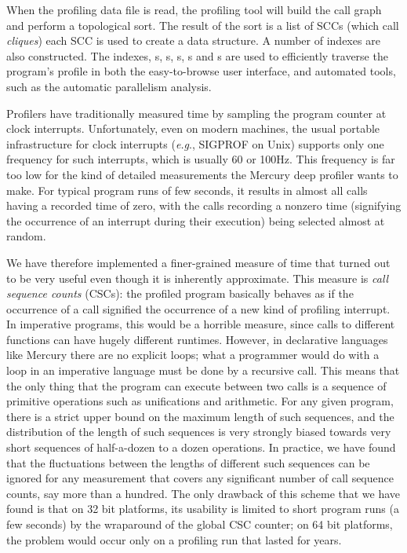\noindent
When the profiling data file is read,
the profiling tool will build the call graph and perform a topological
sort.
The result of the sort is a list of SCCs
(which \citet{conway:2001:mercury-deep} call \emph{cliques})
each SCC is used to create a \Clique data structure.
A number of indexes are also constructed.
The indexes, {\Clique}s, {\PS}s, {\PD}s, {\CSS}s and {\CSD}s are used to
efficiently traverse the program's profile in both
the easy-to-browse user interface,
and automated tools, such as the automatic parallelism analysis.

Profilers have traditionally measured time
by sampling the program counter at clock interrupts.
Unfortunately, even on modern machines,
the usual portable infrastructure for clock interrupts
(\emph{e.g}., SIGPROF on Unix)
supports only one frequency for such interrupts,
which is usually 60 or 100Hz.
This frequency is far too low for the kind of detailed measurements
the Mercury deep profiler wants to make.
For typical program runs of few seconds,
it results in almost all calls having a recorded time of zero,
with the calls recording a nonzero time
(signifying the occurrence of an interrupt during their execution)
being selected almost at random.

We have therefore implemented a finer-grained measure of time
that turned out to be very useful
even though it is inherently approximate.
This measure is \emph{call sequence counts} (CSCs):
the profiled program basically behaves
as if the occurrence of a call signified
the occurrence of a new kind of profiling interrupt.
In imperative programs, this would be a horrible measure,
since calls to different functions can have hugely different runtimes.
However, in declarative languages like Mercury there are no explicit loops;
what a programmer would do with a loop in an imperative language
must be done by a recursive call.
This means that the only thing that the program can execute between two calls
is a sequence of primitive operations such as unifications and arithmetic.
For any given program,
there is a strict upper bound on the maximum length of such sequences,
and the distribution of the length of such sequences
is very strongly biased towards very short sequences
of half-a-dozen to a dozen operations.
In practice, we have found that
the fluctuations between the lengths of different such sequences
can be ignored for any measurement
that covers any significant number of call sequence counts,
say more than a hundred.
The only drawback of this scheme that we have found
is that on 32 bit platforms,
its usability is limited to short program runs (a few seconds)
by the wraparound of the global CSC counter;
on 64 bit platforms, the problem would occur
only on a profiling run that lasted for years.

